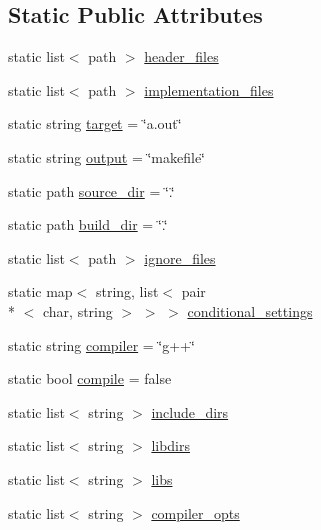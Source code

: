 \subsection*{Static Public Attributes}
\begin{DoxyCompactItemize}
\item 
static list$<$ path $>$ \hyperlink{structsettings_ab910724468ff0119dcb5fec1399eac9f}{header\-\_\-files}
\item 
static list$<$ path $>$ \hyperlink{structsettings_aca3dbe12e7356fd1470e358838053b11}{implementation\-\_\-files}
\item 
static string \hyperlink{structsettings_a9f3ce046370466aa963ce6096b6fcacd}{target} = \char`\"{}a.\-out\char`\"{}
\item 
static string \hyperlink{structsettings_a0ee03de4526f2243b1a8fccfe99021fc}{output} = \char`\"{}makefile\char`\"{}
\item 
static path \hyperlink{structsettings_a60c9f664edda432102c9975131edfa1e}{source\-\_\-dir} = \char`\"{}.\char`\"{}
\item 
static path \hyperlink{structsettings_a900e5b234e36b0395feb215cd807bdac}{build\-\_\-dir} = \char`\"{}.\char`\"{}
\item 
static list$<$ path $>$ \hyperlink{structsettings_aff7f8f80b30749135c089741a4e07b0c}{ignore\-\_\-files}
\item 
static map$<$ string, list$<$ pair\\*
$<$ char, string $>$ $>$ $>$ \hyperlink{structsettings_ac27735f1d33fb886c326a795d4368994}{conditional\-\_\-settings}
\item 
static string \hyperlink{structsettings_a208883e6fc65f3abafbfec8ca0d4989d}{compiler} = \char`\"{}g++\char`\"{}
\item 
static bool \hyperlink{structsettings_a575bd5aad5894fe2b1a9c110506c4a0a}{compile} = false
\item 
static list$<$ string $>$ \hyperlink{structsettings_a08e64a4b8389d43ddb5ac80a9c38b972}{include\-\_\-dirs}
\item 
static list$<$ string $>$ \hyperlink{structsettings_af61346ae2dab3f7390b28e0bf2375f4e}{libdirs}
\item 
static list$<$ string $>$ \hyperlink{structsettings_a7c19b7fd03fe16661f946dbfc1417cb4}{libs}
\item 
static list$<$ string $>$ \hyperlink{structsettings_a5b9460853aa54ea3e48db46744122d54}{compiler\-\_\-opts}
\end{DoxyCompactItemize}


